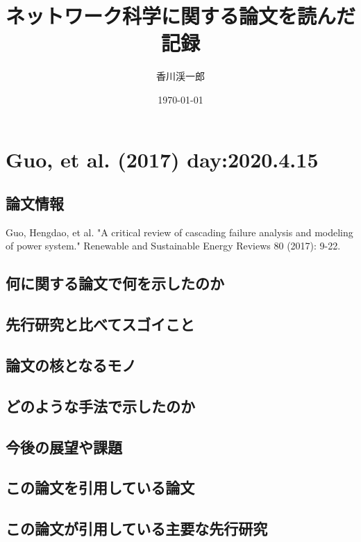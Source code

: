 \documentclass[a4paper,11pt]{jsarticle}
\begin{document}
\title{ネットワーク科学に関する論文を読んだ記録}
\author{香川渓一郎}
\date{\today}
\maketitle


\section{Guo, et al. (2017) day:2020.4.15}
    \subsection{論文情報}
    Guo, Hengdao, et al. "A critical review of cascading failure analysis and modeling of power system." Renewable and Sustainable Energy Reviews 80 (2017): 9-22.
    \subsection{何に関する論文で何を示したのか}
    
    \subsection{先行研究と比べてスゴイこと}
    \subsection{論文の核となるモノ}
    \subsection{どのような手法で示したのか}
    \subsection{今後の展望や課題}
    \subsection{この論文を引用している論文}
    \subsection{この論文が引用している主要な先行研究}
\end{document}
